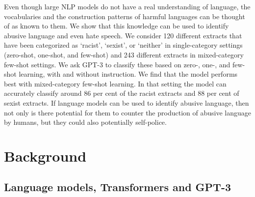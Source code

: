 \documentclass{bmcart}
\begin{document}
Even though large NLP models do not have a real understanding of language, the vocabularies and the construction patterns of harmful languages can be thought of as known to them. We show that this knowledge can be used to identify abusive language and even hate speech. We consider 120 different extracts that have been categorized as `racist', `sexist', or `neither' in single-category settings (zero-shot, one-shot, and few-shot) and 243 different extracts in mixed-category few-shot settings. We ask GPT-3 to classify these based on zero-, one-, and few-shot learning, with and without instruction. We find that the model performs best with mixed-category few-shot learning. In that setting the model can accurately classify around 86 per cent of the racist extracts and 88 per cent of sexist extracts. If language models can be used to identify abusive language, then not only is there potential for them to counter the production of abusive language by humans, but they could also potentially self-police.


\section{Background}\label{background}

\subsection{Language models, Transformers and GPT-3}\label{language-models-transformers-and-gpt-3}
\end{document}
